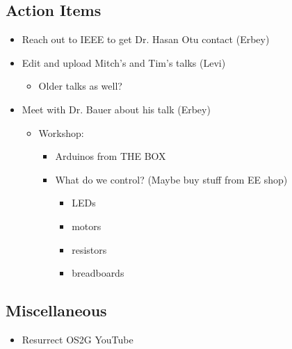 \subsection{Action Items}
    \begin{itemize}
        \item Reach out to IEEE to get Dr. Hasan Otu contact (Erbey)
        \item Edit and upload Mitch's and Tim's talks (Levi)
        \begin{itemize}
            \item Older talks as well?
        \end{itemize}
        \item Meet with Dr. Bauer about his talk (Erbey)
            \begin{itemize}
                \item Workshop:
                \begin{itemize}
                    \item Arduinos from THE BOX
                    \item What do we control? (Maybe buy stuff from EE shop)
                    \begin{itemize}
                        \item LEDs
                        \item motors
                        \item resistors
                        \item breadboards
                    \end{itemize}
                \end{itemize}
            \end{itemize}
    \end{itemize}

\subsection{Miscellaneous}
    \begin{itemize}
        \item Resurrect OS2G YouTube
    \end{itemize}
